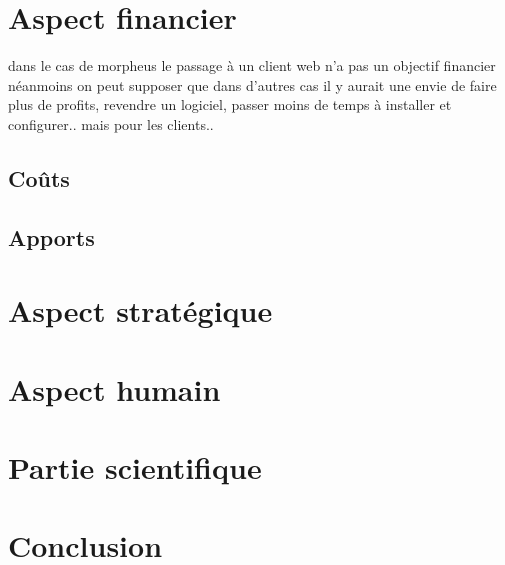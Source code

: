 \documentclass[a4paper, 12pt, french]{article}
\begin{document}
	\section{Aspect financier}
		dans le cas de morpheus le passage à un client web n'a pas un objectif financier néanmoins on peut supposer que dans d'autres cas il y aurait une envie de faire plus de profits, revendre un logiciel, passer moins de temps à installer et configurer.. mais pour les clients..	

		\subsection{Coûts}

		\subsection{Apports}


	\section{Aspect stratégique}

	\section{Aspect humain}


	\section{Partie scientifique}


	\section{Conclusion}


	\newpage
	

	\renewcommand\refname{Bibliographie}
	
	


	\printindex

	\newpage

	\appendix%
\end{document}
